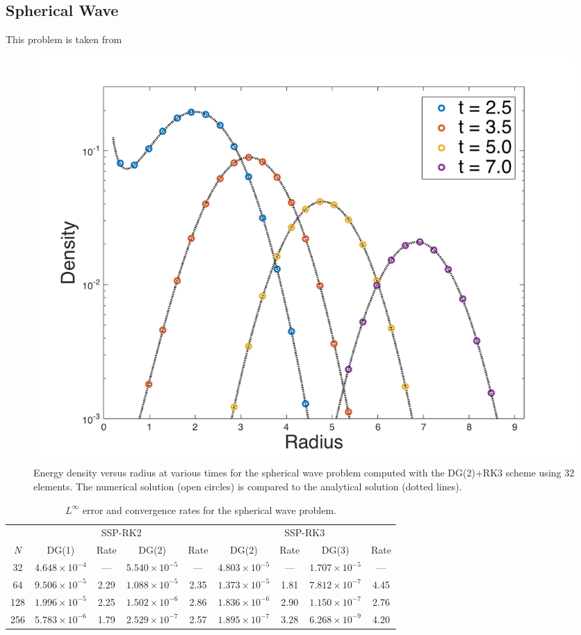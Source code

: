 \documentclass[10pt,preprint]{aastex}
\begin{document}
\subsection{Spherical Wave}

This problem is taken from \citet{pons_etal_2000}

\begin{figure}
  \begin{center}
    \includegraphics[scale=0.38]{./Figures/GaussianSphericalWave1D}
  \end{center}
  \caption{Energy density versus radius at various times for the spherical wave problem computed with the DG(2)+RK3 scheme using 32 elements.  The numerical solution (open circles) is compared to the analytical solution (dotted lines).  }
  \label{fig:sphericalWave}
\end{figure}

\begin{table}
  \begin{center}
  \caption{$L^{\infty}$ error and convergence rates for the spherical wave problem.}
  \begin{tabular}{ccccccccc}
    & \multicolumn{4}{c}{SSP-RK2} & \multicolumn{4}{c}{SSP-RK3} \\
    \cmidrule(r){2-5} \cmidrule(r){6-9}
    $N$ & DG(1) & Rate & DG(2) & Rate & DG(2) & Rate & DG(3) & Rate \\
    \midrule \midrule
    32   & $4.648\times10^{-4}$ & ---  & $5.540\times10^{-5}$ & ---   & $4.803\times10^{-5}$ & ---  & $1.707\times10^{-5}$ & --- \\
    64   & $9.506\times10^{-5}$ &2.29& $1.088\times10^{-5}$ &2.35& $1.373\times10^{-5}$ &1.81& $7.812\times10^{-7}$ &4.45 \\
    128 & $1.996\times10^{-5}$ &2.25& $1.502\times10^{-6}$ &2.86& $1.836\times10^{-6}$ &2.90& $1.150\times10^{-7}$ &2.76 \\
    256 & $5.783\times10^{-6}$ &1.79& $2.529\times10^{-7}$ &2.57& $1.895\times10^{-7}$ &3.28& $6.268\times10^{-9}$ &4.20 \\
    \midrule \midrule
  \end{tabular}
  \end{center}
\end{table}
\end{document}
